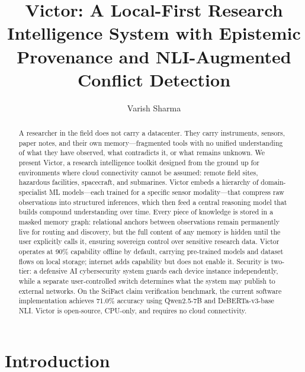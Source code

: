 \documentclass[letterpaper]{article}          %
\title{Victor: A Local-First Research Intelligence System with Epistemic Provenance and NLI-Augmented Conflict Detection}
\author{Varish Sharma}
\theoremstyle{plain}
\theoremstyle{definition}
\theoremstyle{remark}
\begin{document}
\maketitle


\begin{abstract}
A researcher in the field does not carry a datacenter. They carry instruments, sensors, paper notes, and their own memory---fragmented tools with no unified understanding of what they have observed, what contradicts it, or what remains unknown. We present Victor, a research intelligence toolkit designed from the ground up for environments where cloud connectivity cannot be assumed: remote field sites, hazardous facilities, spacecraft, and submarines. Victor embeds a hierarchy of domain-specialist ML models---each trained for a specific sensor modality---that compress raw observations into structured inferences, which then feed a central reasoning model that builds compound understanding over time. Every piece of knowledge is stored in a masked memory graph: relational anchors between observations remain permanently live for routing and discovery, but the full content of any memory is hidden until the user explicitly calls it, ensuring sovereign control over sensitive research data. Victor operates at 90\% capability offline by default, carrying pre-trained models and dataset flows on local storage; internet adds capability but does not enable it. Security is two-tier: a defensive AI cybersecurity system guards each device instance independently, while a separate user-controlled switch determines what the system may publish to external networks. On the SciFact claim verification benchmark, the current software implementation achieves 71.0\% accuracy using Qwen2.5-7B and DeBERTa-v3-base NLI. Victor is open-source, CPU-only, and requires no cloud connectivity.
\end{abstract}


\section{Introduction}
\end{document}
